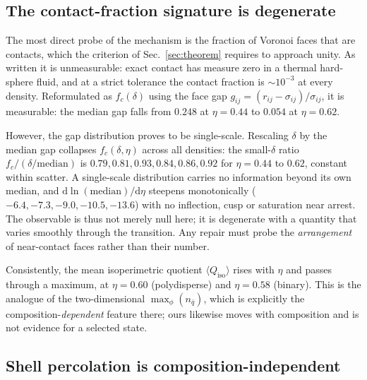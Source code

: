 \documentclass[aps,prl,twocolumn,superscriptaddress,floatfix]{revtex4-2}
\begin{document}
\subsection{The contact-fraction signature is degenerate}

The most direct probe of the mechanism is the fraction of Voronoi faces that are
contacts, which the criterion of Sec.~\ref{sec:theorem} requires to approach
unity. As written it is unmeasurable: exact contact has measure zero in a thermal
hard-sphere fluid, and at a strict tolerance the contact fraction is $\sim10^{-3}$
at every density. Reformulated as $f_c(\delta)$ using the face gap
$g_{ij}=(r_{ij}-\sigma_{ij})/\sigma_{ij}$, it is measurable: the median gap falls
from $0.248$ at $\eta=0.44$ to $0.054$ at $\eta=0.62$.

However, the gap distribution proves to be single-scale. Rescaling $\delta$ by the
median gap collapses $f_c(\delta,\eta)$ across all densities: the small-$\delta$
ratio $f_c/(\delta/\mathrm{median})$ is $0.79, 0.81, 0.93, 0.84, 0.86, 0.92$ for
$\eta=0.44$ to $0.62$, constant within scatter. A single-scale distribution
carries no information beyond its own median, and
$\mathrm{d}\ln(\mathrm{median})/\mathrm{d}\eta$ steepens monotonically
($-6.4,-7.3,-9.0,-10.5,-13.6$) with no inflection, cusp or saturation near
arrest. The observable is thus not merely null here; it is degenerate with a
quantity that varies smoothly through the transition. Any repair must probe the
\emph{arrangement} of near-contact faces rather than their number.

Consistently, the mean isoperimetric quotient $\langle Q_{\mathrm{iso}}\rangle$
rises with $\eta$ and passes through a maximum, at $\eta=0.60$ (polydisperse) and
$\eta=0.58$ (binary). This is the analogue of the two-dimensional
$\max_\phi(n_{\bar q})$, which is explicitly the composition-\emph{dependent}
feature there; ours likewise moves with composition and is not evidence for a
selected state.

\subsection{Shell percolation is composition-independent}
\end{document}

